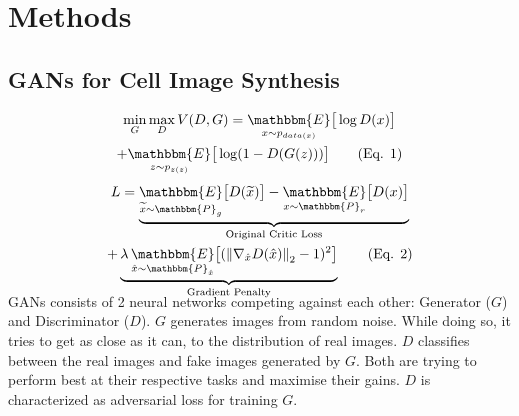 \documentclass{article}
\newcommand\numberthis{\addtocounter{equation}{1}\tag{Eq. \theequation}}
\newcommand\norm[1]{\left\lVert#1\right\rVert}
\newcommand{\squeezeup}{\vspace{-2.5mm}}
\begin{document}
\section{Methods}
\label{sec:methods}
\squeezeup
\subsection{GANs for Cell Image Synthesis}
\label{ssec:submethod1}
\squeezeup
\squeezeup
\begin{multline*}
\min_{G} \max_{D} V(D,G) = 
\underset{x \sim p_{data(x)}}{\mathbbm{E}}
\big[\log D(x)\big]
\\ 
+\underset{z \sim p_{z(z)}}{\mathbbm{E}}
\big[\log (1-D(G(z)))\big] \numberthis \label{eqn1}
\end{multline*}
\vspace{-10.5mm}
\begin{multline*}
L = \underbrace{\underset{\widetilde{x} \sim \mathbbm{P}_{g}}{\mathbbm{E}}\big[D(\widetilde{x})\big] - \underset{x \sim \mathbbm{P}_{r}}{\mathbbm{E}}\big[D(x)\big]}
_\text{Original Critic Loss} 
\\
+ \underbrace{\lambda \, \underset{\hat{x} \sim \mathbbm{P}_{\hat{x}}}{\mathbbm{E}}
\big[ (\norm{\nabla_{\hat{x}} D(\hat{x})}_{2}-1)^2\big]}_\text{Gradient Penalty} \numberthis \label{eqn2}
\vspace{-4.0mm}
\end{multline*}
GANs consists of 2 neural networks competing against each other: Generator ($G$) and Discriminator ($D$). $G$ generates images from random noise. While doing so, it tries to get as close as it can, to the distribution of real images. $D$ classifies between the real images and fake images generated by $G$. Both are trying to perform best at their respective tasks and maximise their gains. $D$ is characterized as adversarial loss for training $G$. \par
\end{document}
